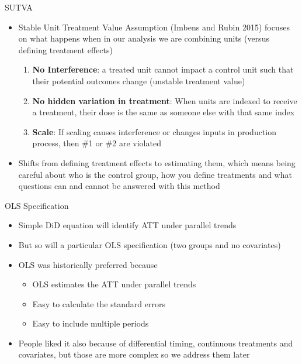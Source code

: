 \documentclass{beamer}
\begin{document}
\begin{frame}{SUTVA}

\begin{itemize}
\item Stable Unit Treatment Value Assumption (Imbens and Rubin 2015) focuses on what happens when in our analysis we are combining units (versus defining treatment effects)
	\begin{enumerate}
	\item \textbf{No Interference}: a treated unit cannot impact a control unit such that their potential outcomes change (unstable treatment value)
	\item \textbf{No hidden variation in treatment}: When units are indexed to receive a treatment, their dose is the same as someone else with that same index
	\item \textbf{Scale}: If scaling causes interference or changes inputs in production process, then \#1 or \#2 are violated
	\end{enumerate}
\item Shifts from defining treatment effects to estimating them, which means being careful about who is the control group, how you define treatments and what questions can and cannot be answered with this method
\end{itemize}

\end{frame}





\begin{frame}{OLS Specification}
	
	\begin{itemize}
	\item Simple DiD equation will identify ATT under parallel trends
	\item But so will a particular OLS specification (two groups and no covariates)
	\item OLS was historically preferred because
		\begin{itemize}
		\item OLS estimates the ATT under parallel trends
		\item Easy to calculate the standard errors
		\item Easy to include multiple periods
		\end{itemize}
	\item People liked it also because of differential timing, continuous treatments and covariates, but those are more complex so we address them later
	\end{itemize}
\end{frame}
\end{document}
